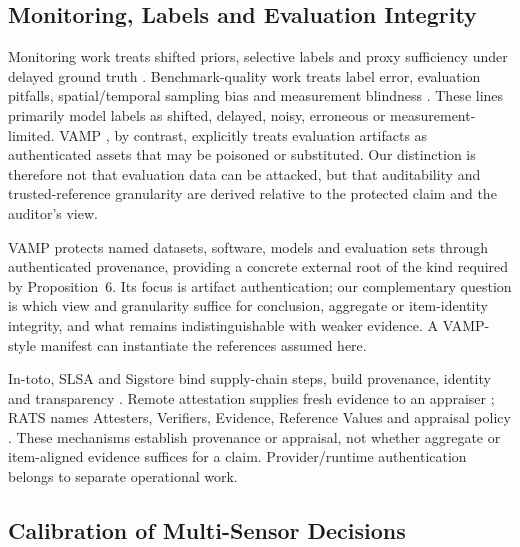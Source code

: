 \documentclass[10pt,journal,compsoc]{IEEEtran}
\begin{document}
\subsection{Monitoring, Labels and Evaluation Integrity}

Monitoring work treats shifted priors, selective labels and proxy sufficiency
under delayed ground truth \cite{Lipton2018,Ginart2022,Koebler2025,
Solozobov2026}. Benchmark-quality work treats label error, evaluation pitfalls,
spatial/temporal sampling bias and measurement blindness
\cite{Northcutt2021,Arp2022,Pendlebury2019,Bajaj2026}. These lines primarily
model labels as shifted, delayed, noisy, erroneous or measurement-limited.
VAMP \cite{Stokes2021}, by contrast, explicitly treats evaluation artifacts as
authenticated assets that may be poisoned or substituted. Our distinction is
therefore not that evaluation data can be attacked, but that auditability and
trusted-reference granularity are derived relative to the protected claim and
the auditor's view.

VAMP protects named datasets, software, models and evaluation sets through
authenticated provenance, providing a concrete external root of the kind
required by Proposition~6. Its focus is artifact authentication; our
complementary question is which view and granularity suffice for conclusion,
aggregate or item-identity integrity, and what remains indistinguishable with
weaker evidence. A VAMP-style manifest can instantiate the references assumed
here.

In-toto, SLSA and Sigstore bind supply-chain steps, build provenance, identity
and transparency \cite{TorresArias2019,SLSA2025,Newman2022}. Remote attestation
supplies fresh evidence to an appraiser \cite{Coker2011}; RATS names Attesters,
Verifiers, Evidence, Reference Values and appraisal policy \cite{Birkholz2023}.
These mechanisms establish provenance or appraisal, not whether aggregate or
item-aligned evidence suffices for a claim. Provider/runtime authentication
belongs to separate operational work.

\subsection{Calibration of Multi-Sensor Decisions}
\end{document}
